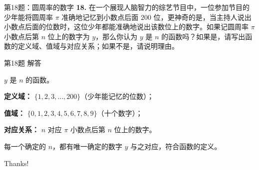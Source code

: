 \documentclass[10pt,aspectratio=169,serif]{beamer}
\begin{document}
\begin{frame}[t]{第18题：圆周率的数字}
\textbf{18.} 在一个展现人脑智力的综艺节目中，一位参加节目的少年能将圆周率 $\pi$ 准确地记忆到小数点后面 $200$ 位，更神奇的是，当主持人说出小数点后面的位数时，这位少年都能准确地说出该数位上的数字。如果记圆周率 $\pi$ 小数点后第 $n$ 位上的数字为 $y$，那么你认为 $y$ 是 $n$ 的函数吗？如果是，请写出函数的定义域、值域与对应关系；如果不是，请说明理由。
\end{frame}

\begin{frame}[t]{第18题 解答}
\begin{tcolorbox}[colback=orange!10,colframe=orange,title=\textbf{解}]
$y$ \alert{是} $n$ 的函数。

\vspace{1em}
\textbf{定义域：} $\{1,2,3,\dots,200\}$（少年能记忆的位数）；

\vspace{0.5em}
\textbf{值域：} $\{0,1,2,3,4,5,6,7,8,9\}$（十个数字）；

\vspace{0.5em}
\textbf{对应关系：} $n$ 对应 $\pi$ 小数点后第 $n$ 位上的数字。

\vspace{1em}
每一个确定的 $n$，都有唯一确定的数字 $y$ 与之对应，符合函数的定义。
\end{tcolorbox}
\end{frame}

\begin{frame}[c]
  \begin{center}
    {\Huge\calligra Thanks!}
  \end{center}
\end{frame}
\end{document}
